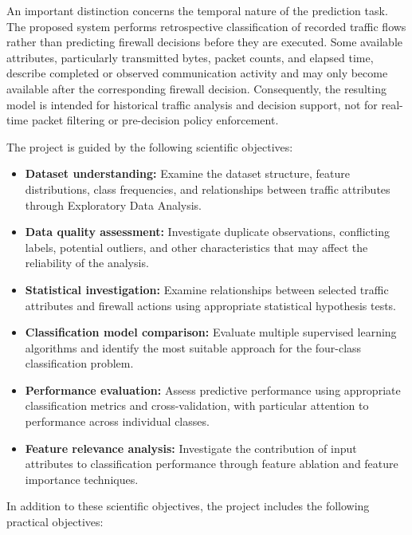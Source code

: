 An important distinction concerns the temporal nature of the prediction task. The proposed system performs retrospective classification of recorded traffic flows rather than predicting firewall decisions before they are executed. Some available attributes, particularly transmitted bytes, packet counts, and elapsed time, describe completed or observed communication activity and may only become available after the corresponding firewall decision. Consequently, the resulting model is intended for historical traffic analysis and decision support, not for real-time packet filtering or pre-decision policy enforcement.

The project is guided by the following scientific objectives:

\begin{itemize}
    \item \textbf{Dataset understanding:} Examine the dataset structure, feature distributions, class frequencies, and relationships between traffic attributes through Exploratory Data Analysis.
    
    \item \textbf{Data quality assessment:} Investigate duplicate observations, conflicting labels, potential outliers, and other characteristics that may affect the reliability of the analysis.
    
    \item \textbf{Statistical investigation:} Examine relationships between selected traffic attributes and firewall actions using appropriate statistical hypothesis tests.
    
    \item \textbf{Classification model comparison:} Evaluate multiple supervised learning algorithms and identify the most suitable approach for the four-class classification problem.
    
    \item \textbf{Performance evaluation:} Assess predictive performance using appropriate classification metrics and cross-validation, with particular attention to performance across individual classes.
    
    \item \textbf{Feature relevance analysis:} Investigate the contribution of input attributes to classification performance through feature ablation and feature importance techniques.
\end{itemize}

In addition to these scientific objectives, the project includes the following practical objectives:

